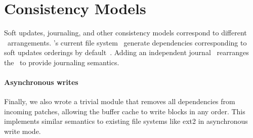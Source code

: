 \section{Consistency Models}
\label{sec:using}

Soft updates, journaling, and other consistency models
correspond to different \chdesc\ arrangements.
%
\Kudos's current file system \modules\ generate dependencies corresponding
to soft updates orderings by default~\cite{ganger00soft}.
%
Adding an independent journal \module\ rearranges the \chdescs\ to provide
journaling semantics.
%
%





\paragraph{Asynchronous writes}
\label{sec:modules:unlink}

Finally, we also wrote a trivial module that removes all dependencies from
incoming patches, allowing the buffer cache to write blocks in any order.
%
This implements similar semantics to existing file systems like ext2 in
asynchronous write mode.


